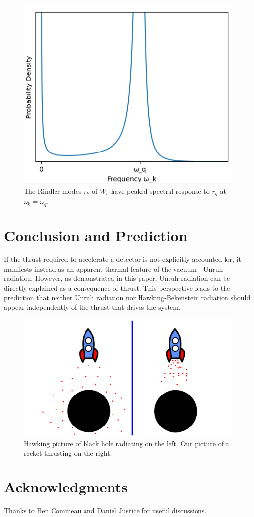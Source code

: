 \documentclass[12pt,a4paper]{article}
\begin{document}
\begin{figure}[h]
  \centering
\includegraphics[scale=0.6]{peaked.png}
\caption{The Rindler modes $r_k$ of $W_c$ have peaked spectral response to $r_q$ at $\omega_k = \omega_q$.}
\label{peaked}
\end{figure}

\section{Conclusion and Prediction}
If the thrust required to accelerate a detector is not explicitly accounted for, it manifests instead as an apparent thermal feature of the vacuum—Unruh radiation. However, as demonstrated in this paper, Unruh radiation can be directly explained as a consequence of thrust. This perspective leads to the prediction that neither Unruh radiation nor Hawking-Bekenstein radiation should appear independently of the thrust that drives the system.

\begin{figure}[h]
\centering
\includegraphics[scale=0.5]{rocket.png}
\caption{Hawking picture of black hole radiating on the left. Our picture of a rocket thrusting on the right.}
\label{rocket}
\end{figure}

\section{Acknowledgments}
Thanks to Ben Commeau and Daniel Justice for useful discussions.



\end{document}
